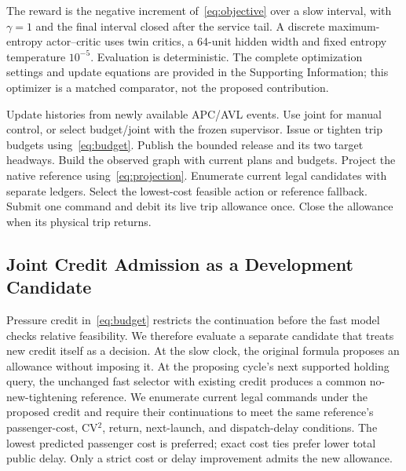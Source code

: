 The reward is the negative increment of~\eqref{eq:objective} over a slow interval, with $\gamma=1$ and the final interval closed after the service tail. A discrete maximum-entropy actor--critic uses twin critics, a 64-unit hidden width and fixed entropy temperature $10^{-5}$. Evaluation is deterministic. The complete optimization settings and update equations are provided in the Supporting Information; this optimizer is a matched comparator, not the proposed contribution.

\begin{algorithm}[t]
\caption{The shared timetable--holding interface}
\label{alg:control}
\begin{algorithmic}[1]
\STATE Update histories from newly available APC/AVL events.
\STATE Use joint for manual control, or select budget/joint with the frozen supervisor.
\STATE Issue or tighten trip budgets using~\eqref{eq:budget}.
\STATE Publish the bounded release and its two target headways.
\ENDIF
\ENDIF
{}
\STATE Build the observed graph with current plans and budgets.
\STATE Project the native reference using~\eqref{eq:projection}.
\STATE Enumerate current legal candidates with separate ledgers.
\STATE Select the lowest-cost feasible action or reference fallback.
\STATE Submit one command and debit its live trip allowance once.
\ENDIF
\STATE Close the allowance when its physical trip returns.
\end{algorithmic}
\end{algorithm}

\subsection{Joint Credit Admission as a Development Candidate}
Pressure credit in~\eqref{eq:budget} restricts the continuation before the fast model checks relative feasibility. We therefore evaluate a separate candidate that treats new credit itself as a decision. At the slow clock, the original formula proposes an allowance without imposing it. At the proposing cycle's next supported holding query, the unchanged fast selector with existing credit produces a common no-new-tightening reference. We enumerate current legal commands under the proposed credit and require their continuations to meet the same reference's passenger-cost, CV$^2$, return, next-launch, and dispatch-delay conditions. The lowest predicted passenger cost is preferred; exact cost ties prefer lower total public delay. Only a strict cost or delay improvement admits the new allowance.

